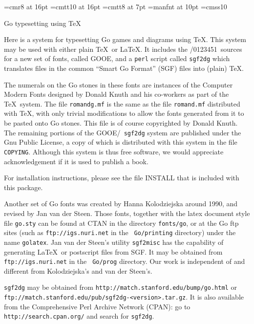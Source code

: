 

\font\titlefont=cmr8 at 16pt
\font\titlett=cmtt10 at 16pt
\font\seventtt=cmtt8 at 7pt
\font\metafnt=manfnt at 10pt
\font\gofont=cmss10
\def\metafont{{\metafnt/0123451}}
\def\\{{\char'134}}

\vfil
\centerline{\titlefont Go typesetting using \TeX}

\bigbreak
Here is a system for typesetting Go games and diagrams using \TeX.
This system may be used with either plain \TeX\ or La\TeX. It includes 
the \metafont\ sources for a new set of fonts, called GOOE, and a {\tt perl}
script called {\tt sgf2dg} which translates files in the common ``Smart Go
Format'' (SGF) files into (plain) \TeX.

The numerals on the Go stones in these fonts are instances of the Computer
Modern Fonts designed by Donald Knuth and his co-workers as part of the
\TeX\ system. The file {\tt romandg.mf} is the same as the file 
{\tt romand.mf} distributed with \TeX, with only trivial modifications 
to allow the fonts generated from it to be pasted onto Go stones. This file is
of course copyrighted by Donald Knuth. The remaining portions of the GOOE/{\tt
sgf2dg} system are published under the Gnu Public License, a copy of which is
distributed with this system in the file {\tt COPYING}. Although this system
is thus free software, we would appreciate acknowledgement if it is used to
publish a book.

For installation instructions, please see the file INSTALL that
is included with this package.

Another set of Go fonts was created by Hanna Kolodziejska around 1990, and
revised by Jan van der Steen. Those fonts, together with the latex document
style file {\tt go.sty} can be found at CTAN in the directory {\tt fonts/go},
or at the Go ftp sites (such as {\tt ftp://igs.nuri.net} in the {\tt
Go/printing} directory) under the name {\tt golatex}. Jan van der Steen's
utility {\tt sgf2misc} has the capability of generating La\TeX\ or postscript
files from SGF. It may be obtained from {\tt ftp://igs.nuri.net} in the {\tt
Go/prog} directory. Our work is independent of and different from
Kolodziejska's and van der Steen's.

{\tt sgf2dg} may be obtained from 
{\tt http://match.stanford.edu/bump/go.html}\hfil\break 
or {\tt ftp://match.stanford.edu/pub/sgf2dg-<version>.tar.gz}.  It is also
available from the Comprehensive Perl Archive Network (CPAN): go to {\tt
http://search.cpan.org/} and search for {\tt sgf2dg}.

